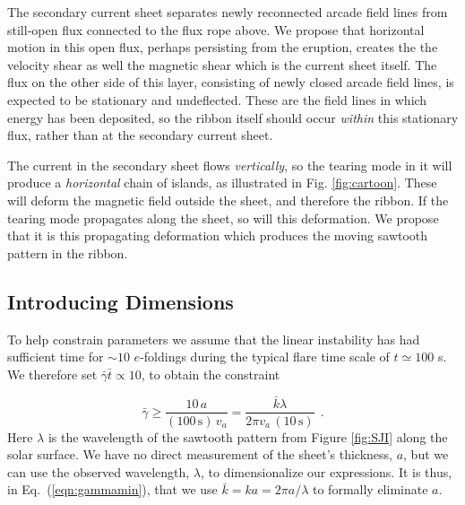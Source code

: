 	The secondary current sheet separates newly reconnected arcade field lines from still-open flux connected to the flux rope above.  We propose that horizontal motion in this open flux, perhaps persisting from the eruption,  creates the the velocity shear as well the magnetic shear which is the current sheet itself.  The flux on the other side of this layer, consisting of newly closed arcade field lines, is expected to be stationary and undeflected.  These are the field lines in which energy has been deposited, so the ribbon itself should occur {\em within} this stationary flux, rather than at the secondary current sheet.
	
	The current in the secondary sheet flows {\em vertically}, so the tearing mode in it will produce a {\em horizontal} chain of islands, as illustrated in Fig. \ref{fig:cartoon}.  These will deform the magnetic field outside the sheet, and therefore the ribbon.  If the tearing mode propagates along the sheet, so will this deformation.   We propose that it is this propagating deformation which produces the moving sawtooth pattern in the ribbon.
	
	  
	
	
\subsection{Introducing Dimensions}
	
	 To help constrain parameters we assume that the linear instability has had sufficient time for $\sim10$ $e$-foldings during the typical flare time scale of $t\simeq100$ s.  We therefore set $\bar{\gamma} \bar{t} \propto 10$, to obtain the constraint
	
	\begin{equation}
	\label{eqn:gammamin}
	\bar{\gamma} \geq \frac{10\,a}{(100\, \mathrm{s})\, v_a}= \frac{\bar{k} \lambda}{2 \pi v_a\, (10\,\mathrm{s})}~~.
	\end{equation}
Here $\lambda$ is the wavelength of the sawtooth pattern from Figure \ref{fig:SJI} along the solar surface.  We have no direct measurement of the sheet's thickness, $a$, but we can use the observed wavelength, $\lambda$, to dimensionalize our expressions.  It is thus, in Eq.\ (\ref{eqn:gammamin}), that we use $\bar{k} = ka = 2\pi a/\lambda$ to formally eliminate $a$. 

